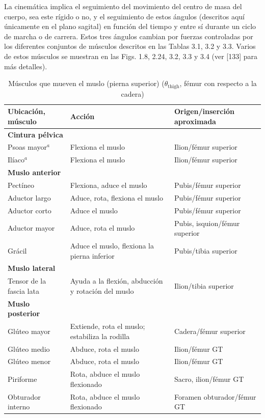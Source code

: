 \documentclass[12pt]{book}
\begin{document}
La cinemática implica el seguimiento del movimiento del centro de masa del cuerpo, sea este rígido o no, y el seguimiento de estos ángulos (descritos aquí únicamente en el plano sagital) en función del tiempo y entre sí durante un ciclo de marcha o de carrera. Estos tres ángulos cambian por fuerzas controladas por los diferentes conjuntos de músculos descritos en las Tablas 3.1, 3.2 y 3.3. Varios de estos músculos se muestran en las Figs. 1.8, 2.24, 3.2, 3.3 y 3.4 (ver [133] para más detalles).

\begin{table}[htbp]
\centering
\caption{Músculos que mueven el muslo (pierna superior) ($\theta_{\text{thigh}}$, fémur con respecto a la cadera)}
\label{tab:31}
\begin{tabularx}{\textwidth}{XXX}
\toprule
\textbf{Ubicación, músculo} & \textbf{Acción} & \textbf{Origen/inserción aproximada} \\
\midrule
\textbf{Cintura pélvica} & & \\
Psoas mayor$^a$ & Flexiona el muslo & Ilion/fémur superior \\
Ilíaco$^a$ & Flexiona el muslo & Ilion/fémur superior \\
\midrule
\textbf{Muslo anterior} & & \\
Pectíneo & Flexiona, aduce el muslo & Pubis/fémur superior \\
Aductor largo & Aduce, rota, flexiona el muslo & Pubis/fémur superior \\
Aductor corto & Aduce el muslo & Pubis/fémur superior \\
Aductor mayor & Aduce, rota el muslo & Pubis, isquion/fémur superior \\
Grácil & Aduce el muslo, flexiona la pierna inferior & Pubis/tibia superior \\
\midrule
\textbf{Muslo lateral} & & \\
Tensor de la fascia lata & Ayuda a la flexión, abducción y rotación del muslo & Ilion/tibia superior \\
\midrule
\textbf{Muslo posterior} & & \\
Glúteo mayor & Extiende, rota el muslo; estabiliza la rodilla & Cadera/fémur superior \\
Glúteo medio & Abduce, rota el muslo & Ilion/fémur GT \\
Glúteo menor & Abduce, rota el muslo & Ilion/fémur GT \\
Piriforme & Rota, abduce el muslo flexionado & Sacro, ilion/fémur GT \\
Obturador interno & Rota, abduce el muslo flexionado & Foramen obturador/fémur GT \\

\end{tabularx}
\end{table}
\end{document}
